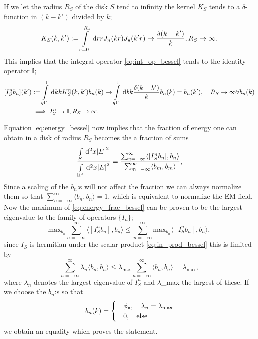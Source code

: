 \documentclass[11pt,a4paper, 
swedish,english %
]{article}
\begin{document}
If we let the radius $R_S$ of the disk $S$ tend to infinity the kernel $K_S$ tends to a $\delta$-function in $(k-k')$ divided by $k$;
\begin{equation*}
K_S(k,k')  := \int_{r=0}^{R_s} \id r r J_n(kr) J_n(k'r) \to \frac{\delta(k-k')}{k}, R_S \to \infty.
  \end{equation*}
This implies that the integral operator \ref{eq:int_op_bessel} tends to the identity operator $\mathbb{I}$;
\begin{equation*}
  \begin{aligned}
    [I_S^nb_n](k')&:=\int_{q\Gamma}^\Gamma \id k k K_S^n(k,k')b_n(k) \to \int_{q\Gamma}^\Gamma \id k k \frac{\delta(k-k')}{k}b_n(k)
    =b_n(k') \qc R_S \to \infty \forall b_n(k)\\
  &\implies I_S^n \to \mathbb{I}, R_S \to \infty
   \end{aligned}
\end{equation*}

Equation \eqref{eq:energy_bessel} now implies that the fraction of energy one can obtain in a disk of radius $R_S$ becomes the a fraction of sums
\begin{equation}
  \label{eq:energy_frac_bessel}
\frac{\int_S \id^2x \abs{E}^2}{\int_{\mathbb{R}^2} \id^2x \abs{E}^2}=\frac{\sum_{n=-\infty}^{\infty} \langle [I_S^nb_n],b_n \rangle}{\sum_{m=-\infty}^{\infty} \langle b_m,b_m \rangle},
\end{equation}
Since a scaling of the $b_n$:s will not affect the fraction we can
always normalize them so that $\sum_{n=-\infty}^{\infty} \langle b_n, b_n \rangle=1$, which is equivalent to normalize the EM-field.
Now the maximum of \eqref{eq:energy_frac_bessel} can be proven to be the largest eigenvalue to the family of operators $\{I_n\}$;
\begin{equation*}
  \text{max}_{b_n} \sum_{n=-\infty}^{\infty} \langle [I_S^nb_n],b_n \rangle
  \leq \sum_{n=-\infty}^{\infty} \text{max}_{b_n}\langle [I_S^nb_n],b_n \rangle,
  \end{equation*}
since $I_S$ is hermitian under the scalar product \ref{eq:in_prod_bessel} this is limited by
\begin{equation*}
  \sum_{n=-\infty}^{\infty}\lambda_n \langle b_n, b_n \rangle \leq \lambda_{\text{max}}\sum_{n=-\infty}^{\infty}\langle b_n, b_n\rangle=\lambda_{\text{max}},
\end{equation*}
where $\lambda_n$ denotes the largest eigenvalue of $I_S^n$ and $\lambda$_{max} the largest of these.
If we choose the $b_n$:s so that
\begin{equation*}
  b_n(k)
  =\begin{cases} &\phi_n \qc \lambda_n=\lambda_{\text{max}}  \\
  &0 \qc \text{else}
  \end{cases}
\end{equation*}
we obtain an equality which proves the statement.
  
\end{document}

